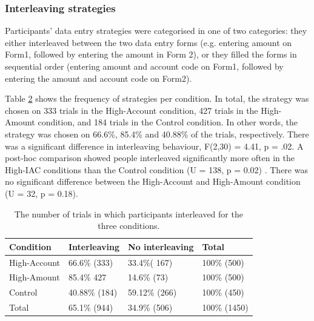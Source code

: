 \begin{table}
\begin{itemize}
\subsubsection{Interleaving strategies}

Participants' data entry strategies were categorised in one of two categories: they either interleaved between the two data entry forms (e.g. entering amount on Form1, followed by entering the amount in Form 2), or they filled the forms in sequential order (entering amount and account code on Form1, followed by entering the amount and account code on Form2).

Table \ref{table:ch34_Study5interleavingfreqtbl} shows the frequency of strategies per condition. In total, the strategy was chosen on 333 trials in the High-Account condition, 427 trials in the High-Amount condition, and 184 trials in the Control condition. In other words, the strategy was chosen on 66.6\%, 85.4\% and 40.88\% of the trials, respectively.  There was a significant difference in interleaving behaviour,
F(2,30) = 4.41, p = .02. A post-hoc comparison showed people interleaved significantly more often in the High-IAC conditions than the Control condition  (U = 138, p = 0.02) . There was no significant difference between the High-Account and High-Amount condition (U = 32, p = 0.18).



\begin{table}[]
\centering
\begin{tabular}{|l|l|l|l|}
\hline
Condition    & Interleaving & No interleaving & Total \\ \hline
High-Account & 66.6\% (333)          & 33.4\%( 167)             & 100\% (500)   \\ \hline
High-Amount  & 85.4\% 427          & 14.6\% (73)              & 100\% (500)   \\ \hline
Control      & 40.88\% (184)          & 59.12\% (266)             & 100\% (450)   \\ \hline
Total             & 65.1\% (944)          & 34.9\% (506)             & 100\% (1450)  \\ \hline
\end{tabular}
\caption{The number of trials in which participants interleaved for the three conditions.}\label{table:ch34_Study5interleavingfreqtbl}
\end{table}


\end{itemize}
\end{table}
